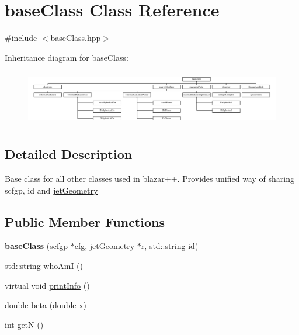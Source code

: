 \hypertarget{classbaseClass}{\section{base\-Class Class Reference}
\label{classbaseClass}
}


{\ttfamily \#include $<$base\-Class.\-hpp$>$}

Inheritance diagram for base\-Class\-:\begin{figure}[H]
\begin{center}
\leavevmode
\includegraphics[height=2.456140cm]{classbaseClass}
\end{center}
\end{figure}


\subsection{Detailed Description}
Base class for all other classes used in blazar++. Provides unified way of sharing scfgp, id and \hyperlink{classjetGeometry}{jet\-Geometry} \subsection*{Public Member Functions}
\begin{DoxyCompactItemize}
\item 
\hypertarget{classbaseClass_a5771803aa5b82f52a1dcb6679fc047be}{{\bfseries base\-Class} (scfgp $\ast$\hyperlink{classbaseClass_a744f87a6ebe63da08256c022d42a4ca7}{cfg}, \hyperlink{classjetGeometry}{jet\-Geometry} $\ast$\hyperlink{classbaseClass_a482bb9b1d94f3eb3f31026d14e9a2bb6}{r}, std\-::string \hyperlink{classbaseClass_a4d5ff386a69bcbe21b5976f55b624df6}{id})}\label{classbaseClass_a5771803aa5b82f52a1dcb6679fc047be}

\item 
std\-::string \hyperlink{classbaseClass_a756d5accf10ced9a34024048c95a51c9}{who\-Am\-I} ()
\item 
virtual void \hyperlink{classbaseClass_a67f911cca483b620b908c69dfa4f3ad7}{print\-Info} ()
\item 
double \hyperlink{classbaseClass_a208facecf3a4480b47bebfce91413a39}{beta} (double x)
\item 
int \hyperlink{classbaseClass_a6ba5c4ce24742db73f45064337cf6963}{get\-N} ()
\end{DoxyCompactItemize}
